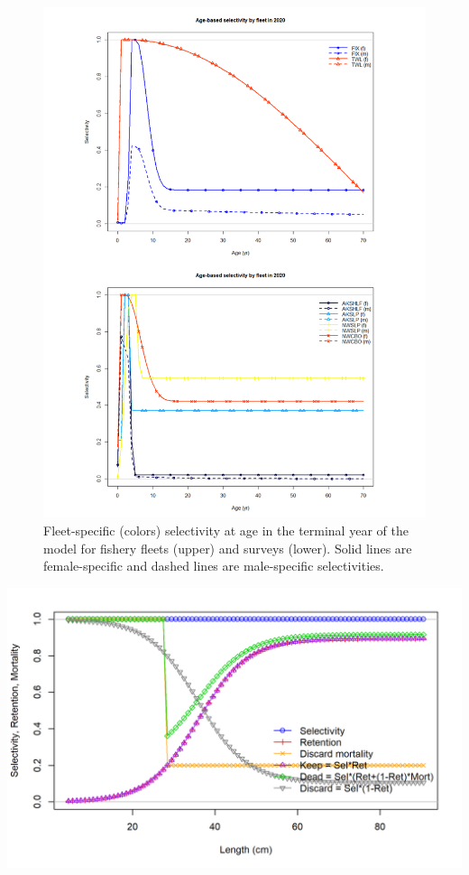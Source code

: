 \documentclass[11pt,
  english,
  a4paper,
]{article}
\begin{document}
\begin{figure}
\centering
\includegraphics[width=1\textwidth,height=1\textheight]{figs/selx_age_stack.png}
\caption{Fleet-specific (colors) selectivity at age in the terminal year of the model for fishery fleets (upper) and surveys (lower). Solid lines are female-specific and dashed lines are male-specific selectivities.\label{fig:selectivityatageALL}}
\end{figure}

\tagmcend\tagstructend

\clearpage


\includegraphics[width=1\textwidth,height=1\textheight]{figs/sel09_len_flt1sex1.png}
\end{document}
